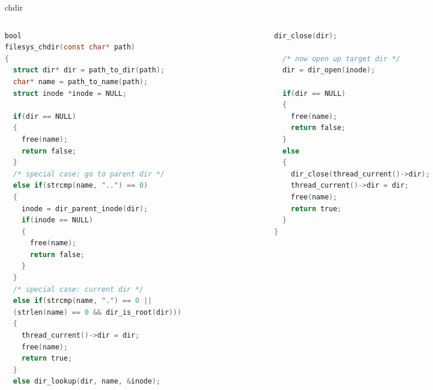 \documentclass[10pt]{beamer}
\begin{document}
\begin{frame}[fragile]{chdir}
\begin{columns}
\begin{column}{0.5\textwidth}
\begin{lstlisting}[language=C]
bool
filesys_chdir(const char* path)
{
  struct dir* dir = path_to_dir(path);
  char* name = path_to_name(path);
  struct inode *inode = NULL;
  
  if(dir == NULL) 
  {
    free(name);
    return false;
  }
  /* special case: go to parent dir */
  else if(strcmp(name, "..") == 0)
  {
    inode = dir_parent_inode(dir);
    if(inode == NULL)
    {
      free(name);
      return false;
    }
  }
  /* special case: current dir */
  else if(strcmp(name, ".") == 0 ||
  (strlen(name) == 0 && dir_is_root(dir)))
  {
    thread_current()->dir = dir;
    free(name);
    return true;
  }
  else dir_lookup(dir, name, &inode);
\end{lstlisting}
\end{column}
\begin{column}{0.5\textwidth}
\begin{lstlisting}[language=C]
 dir_close(dir);

  /* now open up target dir */
  dir = dir_open(inode);

  if(dir == NULL) 
  {
    free(name);
    return false;
  }
  else
  {
    dir_close(thread_current()->dir);
    thread_current()->dir = dir;
    free(name);
    return true;
  }
}
\end{lstlisting}
\end{column}
\end{columns}
\end{frame}
\end{document}

